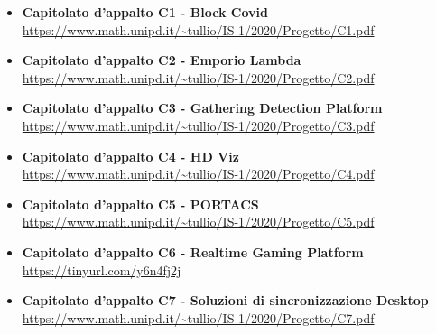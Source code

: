\begin{itemize}
\item \textbf {Capitolato d'appalto C1 - Block Covid}\\
\url{https://www.math.unipd.it/~tullio/IS-1/2020/Progetto/C1.pdf}
\item \textbf {Capitolato d'appalto C2 - Emporio Lambda}\\
\url{https://www.math.unipd.it/~tullio/IS-1/2020/Progetto/C2.pdf}
\item \textbf {Capitolato d'appalto C3 - Gathering Detection Platform}\\
\url{https://www.math.unipd.it/~tullio/IS-1/2020/Progetto/C3.pdf}
\item \textbf {Capitolato d'appalto C4 - HD Viz }\\
\url{https://www.math.unipd.it/~tullio/IS-1/2020/Progetto/C4.pdf}
\item \textbf {Capitolato d'appalto C5 - PORTACS}\\
\url{https://www.math.unipd.it/~tullio/IS-1/2020/Progetto/C5.pdf}
\item \textbf {Capitolato d'appalto C6 - Realtime Gaming Platform}\\
\url{https://tinyurl.com/y6n4fj2j}
\item \textbf {Capitolato d'appalto C7 - Soluzioni di sincronizzazione Desktop}\\
\url{https://www.math.unipd.it/~tullio/IS-1/2020/Progetto/C7.pdf}

\end{itemize}
